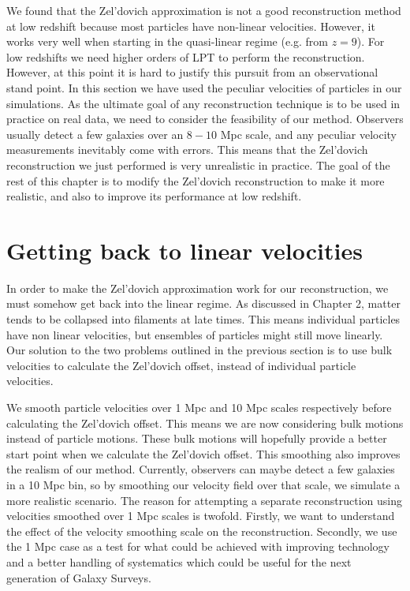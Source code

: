 We found that the Zel'dovich approximation is not a good reconstruction method at low redshift because most particles have non-linear velocities. However, it works very well when starting in the quasi-linear regime (e.g. from $z=9$). For low redshifts we need higher orders of LPT to perform the reconstruction. However, at this point it is hard to justify this pursuit from an observational stand point. In this section we have used the peculiar velocities of particles in our simulations. As the ultimate goal of any reconstruction technique is to be used in practice on real data, we need to consider the feasibility of our method. Observers usually detect a few galaxies over an $8-10$ Mpc scale, and any peculiar velocity measurements inevitably come with errors. This means that the Zel'dovich reconstruction we just performed is very unrealistic in practice. The goal of the rest of this chapter is to modify the Zel'dovich reconstruction to make it more realistic, and also to improve its performance at low redshift.

\section{Getting back to linear velocities}

In order to make the Zel'dovich approximation work for our reconstruction, we must somehow get back into the linear regime. As discussed in Chapter 2, matter tends to be collapsed into filaments at late times. This means individual particles have non linear velocities, but ensembles of particles might still move linearly. Our solution to the two problems outlined in the previous section is to use bulk velocities to calculate the Zel'dovich offset, instead of individual particle velocities.

We smooth particle velocities over 1 Mpc and 10 Mpc scales respectively before calculating the Zel'dovich offset. This means we are now considering bulk motions instead of particle motions. These bulk motions will hopefully provide a better start point when we calculate the Zel'dovich offset. This smoothing also improves the realism of our method. Currently, observers can maybe detect a few galaxies in a 10 Mpc bin, so by smoothing our velocity field over that scale, we simulate a more realistic scenario. The reason for attempting a separate reconstruction using velocities smoothed over 1 Mpc scales is twofold. Firstly, we want to understand the effect of the velocity smoothing scale on the reconstruction. Secondly, we use the 1 Mpc case as a test for what could be achieved with improving technology and a better handling of systematics which could be useful for the next generation of Galaxy Surveys.

